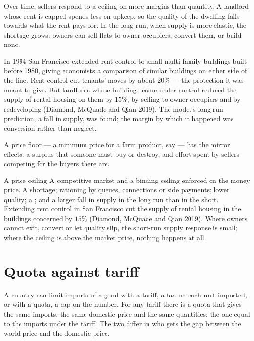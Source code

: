 Over time, sellers respond to a ceiling on more margins than quantity. A
landlord whose rent is capped spends less on upkeep, so the quality of the
dwelling falls towards what the rent pays for. In the long run, when supply
is more elastic, the shortage grows: owners can sell flats to owner
occupiers, convert them, or build none.

\begin{record}
In 1994 San Francisco extended rent control to small multi-family buildings
built before 1980, giving economists a comparison of similar buildings on
either side of the line. Rent control cut tenants' moves by about $20\%$ ---
the protection it was meant to give. But landlords whose buildings came
under control reduced the supply of rental housing on them by $15\%$, by
selling to owner occupiers and by redeveloping (Diamond, McQuade and Qian
2019). %
The model's long-run prediction, a fall in supply, was found; the margin by
which it happened was conversion rather than neglect.
\end{record}

A price floor --- a minimum price for a farm product, say --- has the
mirror effects: a surplus that someone must buy or destroy, and effort
spent by sellers competing for the buyers there are.

\begin{model}{A price ceiling}
\assumes A competitive market and a binding ceiling enforced on the money
price.
\predicts A shortage; rationing by queues, connections or side payments;
lower quality; a ; and a larger fall in supply in the long
run than in the short.
\tested Extending rent control in San Francisco cut the supply of rental
housing in the buildings concerned by $15\%$ (Diamond, McQuade and Qian
2019). %
\breaks Where owners cannot exit, convert or let quality slip, the
short-run supply response is small; where the ceiling is above the market
price, nothing happens at all.
\end{model}

\section{Quota against tariff}\label{sec:b1:price-theory-at-work:quota}

A country can limit imports of a good with a tariff, a tax on each unit
imported, or with a quota, a cap on the number. For any tariff there is a
quota that gives the same imports, the same domestic price and the same
quantities: the one equal to the imports under the tariff. The two differ
in who gets the gap between the world price and the domestic price.

